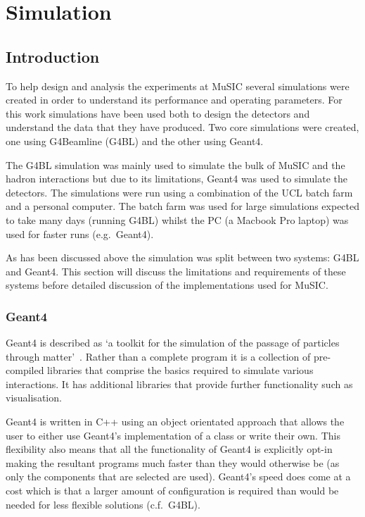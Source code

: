 \part{Simulation} %
\label{prt:simulation}
\chapter{Introduction} %
\label{cha:sim_introduction}
To help design and analysis the experiments at MuSIC several simulations were created in order to understand its performance and operating parameters. For this work simulations have been used both to design the detectors and understand the data that they have produced. Two core simulations were created, one using G4Beamline (G4BL) and the other using Geant4. 

The G4BL simulation was mainly used to simulate the bulk of MuSIC and the hadron interactions but due to its limitations, Geant4 was used to simulate the detectors. The simulations were run using a combination of the UCL batch farm and a personal computer. The batch farm was used for large simulations expected to take many days (running G4BL) whilst the PC (a Macbook Pro laptop) was used for faster runs (e.g.\ Geant4).

As has been discussed above the simulation was split between two systems: G4BL and Geant4. This section will discuss the limitations and requirements of these systems before detailed discussion of the implementations used for MuSIC.

\section{Geant4} %
\label{sec:geant4}
Geant4 is described as `a toolkit for the simulation of the passage of particles through matter'~\cite{Geant4 REF}. Rather than a complete program it is a collection of pre-compiled libraries that comprise the basics required to simulate various interactions. It has additional libraries that provide further functionality such as visualisation. 

Geant4 is written in C++ using an object orientated approach that allows the user to either use Geant4's implementation of a class or write their own. This flexibility also means that all the functionality of Geant4 is explicitly opt-in making the resultant programs much faster than they would otherwise be (as only the components that are selected are used). Geant4's speed does come at a cost which is that a larger amount of configuration is required than would be needed for less flexible solutions (c.f.\ G4BL).

